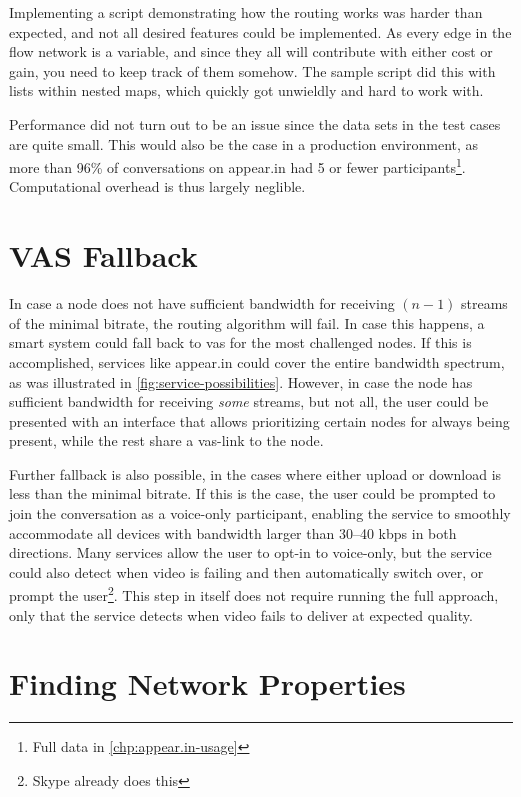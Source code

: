 Implementing a script demonstrating how the routing works was harder than expected, and not all desired features could be implemented. As every edge in the flow network is a variable, and since they all will contribute with either cost or gain, you need to keep track of them somehow. The sample script did this with lists within nested maps, which quickly got unwieldly and hard to work with.

Performance did not turn out to be an issue since the data sets in the test cases are quite small. This would also be the case in a production environment, as more than 96\% of conversations on appear.in had 5 or fewer participants\footnote{Full data in \autoref{chp:appear.in-usage}}. Computational overhead is thus largely neglible.


\section{VAS Fallback}

In case a node does not have sufficient bandwidth for receiving $(n-1)$ streams of the minimal bitrate, the routing algorithm will fail. In case this happens, a smart system could fall back to \gls{vas} for the most challenged nodes. If this is accomplished, services like appear.in could cover the entire bandwidth spectrum, as was illustrated in \autoref{fig:service-possibilities}. However, in case the node has sufficient bandwidth for receiving \emph{some} streams, but not all, the user could be presented with an interface that allows prioritizing certain nodes for always being present, while the rest share a \gls{vas}-link to the node.

Further fallback is also possible, in the cases where either upload or download is less than the minimal bitrate. If this is the case, the user could be prompted to join the conversation as a voice-only participant, enabling the service to smoothly accommodate all devices with bandwidth larger than 30--40 kbps in both directions. Many services allow the user to opt-in to voice-only, but the service could also detect when video is failing and then automatically switch over, or prompt the user\footnote{Skype already does this}. This step in itself does not require running the full approach, only that the service detects when video fails to deliver at expected quality.


\section{Finding Network Properties}

